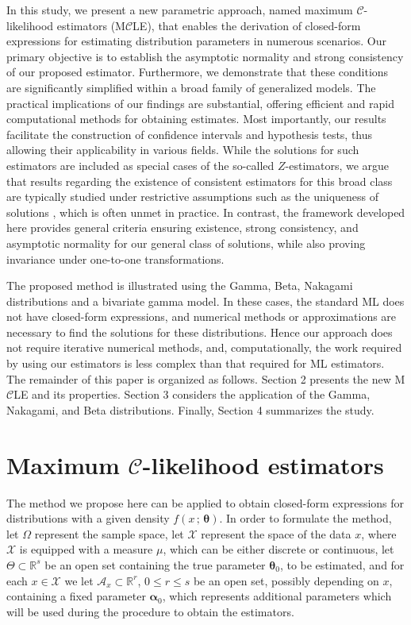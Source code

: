 \documentclass[10pt,a4paper,onecolumn]{article} %
\newcommand{\bs}{\boldsymbol}
\begin{document}
In this study, we present a new parametric approach, named maximum $\mathcal{C}$-likelihood estimators (M$\mathcal{C}$LE), that enables the derivation of closed-form expressions for estimating distribution parameters in numerous scenarios. Our primary objective is to establish the asymptotic normality and strong consistency of our proposed estimator. Furthermore, we demonstrate that these conditions are significantly simplified within a broad family of generalized models. The practical implications of our findings are substantial, offering efficient and rapid computational methods for obtaining estimates. Most importantly, our results facilitate the construction of confidence intervals and hypothesis tests, thus allowing their applicability in various fields. While the solutions for such estimators are included as special cases of the so-called $Z$-estimators, we argue that results regarding the existence of consistent estimators for this broad class are typically studied under restrictive assumptions such as the uniqueness of solutions \cite{1996-Vaart, 1998-Vaart}, which is often unmet in practice. In contrast, the framework developed here provides general criteria ensuring existence, strong consistency, and asymptotic normality for our general class of solutions, while also proving invariance under one-to-one transformations.

The proposed method is illustrated using the Gamma, Beta, Nakagami distributions and a bivariate gamma model. In these cases, the standard ML does not have closed-form expressions, and numerical methods or approximations are necessary to find the solutions for these distributions. Hence our approach does not require iterative numerical methods, and, computationally, the work required by using our estimators is less complex than that required for ML estimators. The remainder of this paper is organized as follows. Section 2 presents the new M$\mathcal{C}$LE and its properties. Section 3 considers the application of the Gamma, Nakagami, and Beta distributions. Finally, Section 4 summarizes the study.


\section{Maximum $\mathcal{C}$-likelihood estimators}

The method we propose here can be applied to obtain closed-form expressions for distributions with a given density $f(x\,;\,\bs\theta)$. In order to formulate the method, let $\Omega$ represent the sample space, let $\mathcal{X}$ represent the space of the data $x$, where $\mathcal{X}$ is equipped with a measure $\mu$, which can be either discrete or continuous, let $\Theta\subset \mathbb{R}^{s}$ be an open set containing the true parameter $\bs{\theta}_0$, to be estimated, and for each $x\in \mathcal{X}$ we let $\mathcal{A}_x\subset \mathbb{R}^{r}$, $0\leq r\leq s$ be an open set, possibly depending on $x$, containing a fixed parameter $\bs{\alpha}_0$, which represents additional parameters which will be used during the procedure to obtain the estimators.
\end{document}
